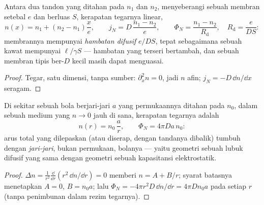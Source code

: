 \begin{proposition}\label{prop:b2:particle-diffusion:membrane}
Antara dua tandon yang ditahan pada $n_1$ dan $n_2$, menyeberangi sebuah membran
setebal $e$ dan berluas $S$, kerapatan tegarnya linear,
\[
n(x) = n_1 + (n_2 - n_1)\frac{x}{e}, \qquad
j_N = D\,\frac{n_1 - n_2}{e}, \qquad
\Phi_N = \frac{n_1 - n_2}{R_{\text{d}}}, \quad R_{\text{d}} = \frac{e}{DS}:
\]
membrannya mempunyai \emph{hambatan difusif} $e/DS$, tepat sebagaimana sebuah kawat
mempunyai $\ell/\gamma S$ --- hambatan yang terseri bertambah, dan sebuah membran tipis
ber-$D$ kecil masih dapat menguasai.
\end{proposition}

\begin{proof}
Tegar, satu dimensi, tanpa sumber: $\partial_x^2 n = 0$, jadi $n$
afin; $j_N = -D\,\dd n/\dd x$ seragam.
\end{proof}

\begin{proposition}\label{prop:b2:particle-diffusion:sphere}
Di sekitar sebuah bola berjari-jari $a$ yang permukaannya ditahan pada $n_0$, dalam sebuah
medium yang $n \to 0$ jauh di sana, kerapatan tegarnya adalah
\[
n(r) = n_0\,\frac{a}{r}, \qquad
\Phi_N = 4\pi D a\,n_0 :
\]
arus total yang dilepaskan (atau diserap, dengan tandanya dibalik) tumbuh
dengan \emph{jari-jari}, bukan permukaan, bolanya --- yaitu
geometri sebuah lubuk difusif yang sama dengan geometri sebuah kapasitansi elektrostatik.
\end{proposition}

\begin{proof}
$\Delta n = \frac{1}{r^2}\frac{\dd}{\dd r}(r^2\,\dd n/\dd r) = 0$ memberi
$n = A + B/r$; syarat batasnya menetapkan $A = 0$, $B = n_0 a$; lalu
$\Phi_N = -4\pi r^2 D\,\dd n/\dd r = 4\pi D n_0 a$ pada setiap $r$ (tanpa
penimbunan dalam rezim tegarnya).
\end{proof}

